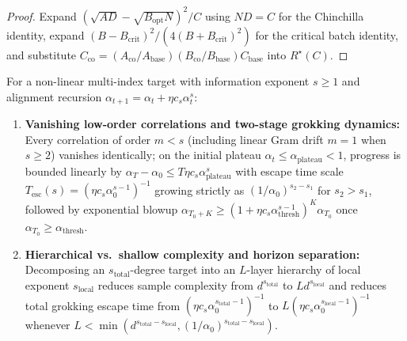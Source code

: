 \begin{proof}
\leanok
Expand $(\sqrt{AD} - \sqrt{B_{\mathrm{opt}}N})^2 / C$ using $ND=C$ for the Chinchilla identity, expand $(B - B_{\mathrm{crit}})^2 / (4(B+B_{\mathrm{crit}})^2)$ for the critical batch identity, and substitute $C_{\mathrm{co}} = (A_{\mathrm{co}}/A_{\mathrm{base}})(B_{\mathrm{co}}/B_{\mathrm{base}})C_{\mathrm{base}}$ into $R^\star(C)$.
\end{proof}

\begin{lemma}\label{lem:hierarchical_multi_index}
\leanok
{}
For a non-linear multi-index target with information exponent $s \ge 1$ and alignment recursion $\alpha_{t+1} = \alpha_t + \eta c_s \alpha_t^s$:
\begin{enumerate}
\item \textbf{Vanishing low-order correlations and two-stage grokking dynamics:} Every correlation of order $m < s$ (including linear Gram drift $m=1$ when $s \ge 2$) vanishes identically; on the initial plateau $\alpha_t \le \alpha_{\mathrm{plateau}} < 1$, progress is bounded linearly by $\alpha_T - \alpha_0 \le T\eta c_s\alpha_{\mathrm{plateau}}^s$ with escape time scale $T_{\mathrm{esc}}(s) = (\eta c_s\alpha_0^{s-1})^{-1}$ growing strictly as $(1/\alpha_0)^{s_2 - s_1}$ for $s_2 > s_1$, followed by exponential blowup $\alpha_{T_0+K} \ge (1 + \eta c_s\alpha_{\mathrm{thresh}}^{s-1})^K\alpha_{T_0}$ once $\alpha_{T_0} \ge \alpha_{\mathrm{thresh}}$.
\item \textbf{Hierarchical vs.\ shallow complexity and horizon separation:} Decomposing an $s_{\mathrm{total}}$-degree target into an $L$-layer hierarchy of local exponent $s_{\mathrm{local}}$ reduces sample complexity from $d^{s_{\mathrm{total}}}$ to $L d^{s_{\mathrm{local}}}$ and reduces total grokking escape time from $(\eta c_s\alpha_0^{s_{\mathrm{total}}-1})^{-1}$ to $L(\eta c_s\alpha_0^{s_{\mathrm{local}}-1})^{-1}$ whenever $L < \min(d^{s_{\mathrm{total}}-s_{\mathrm{local}}}, (1/\alpha_0)^{s_{\mathrm{total}}-s_{\mathrm{local}}})$.
\end{enumerate}
\end{lemma}
